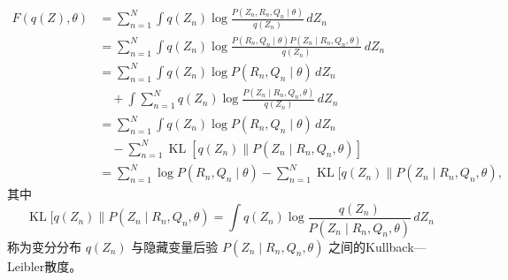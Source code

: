 \begin{equation}
\begin{aligned}
F(q(Z),\theta)
&=\sum_{n=1}^{N}\int q(Z_n)\log\frac{P(Z_n,R_n,Q_n\mid\theta)}{q(Z_n)}\,dZ_n\\
&=\sum_{n=1}^{N}\int q(Z_n)
 \log\frac{P(R_n,Q_n\mid\theta)P(Z_n\mid R_n,Q_n,\theta)}{q(Z_n)}\,dZ_n\\
&=\sum_{n=1}^{N}\int q(Z_n)\log P(R_n,Q_n\mid\theta)\,dZ_n\\
&\quad{}+\int\sum_{n=1}^{N}q(Z_n)
 \log\frac{P(Z_n\mid R_n,Q_n,\theta)}{q(Z_n)}\,dZ_n\\
&=\sum_{n=1}^{N}\int q(Z_n)\log P(R_n,Q_n\mid\theta)\,dZ_n\\
&\quad{}-\sum_{n=1}^{N}\operatorname{KL}[q(Z_n)\|P(Z_n\mid R_n,Q_n,\theta)]\\
&=\sum_{n=1}^{N}\log P(R_n,Q_n\mid\theta)
 -\sum_{n=1}^{N}\operatorname{KL}[q(Z_n)\|P(Z_n\mid R_n,Q_n,\theta),
\end{aligned}\tag{4.A.17}
\end{equation}
其中
\begin{equation}
\operatorname{KL}[q(Z_n)\|P(Z_n\mid R_n,Q_n,\theta)
=\int q(Z_n)\log\frac{q(Z_n)}{P(Z_n\mid R_n,Q_n,\theta)}\,dZ_n\tag{4.A.18}
\end{equation}
称为变分分布 $q(Z_n)$ 与隐藏变量后验 $P(Z_n\mid R_n,Q_n,\theta)$ 之间的Kullback—Leibler散度。

